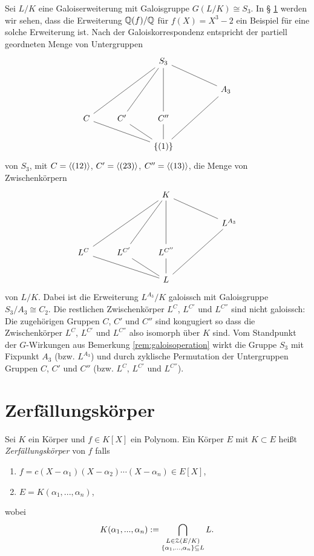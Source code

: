\documentclass{book}
\begin{document}
\begin{exa}
    \label{exa:label}
    Sei $L/K$ eine Galoiserweiterung mit Galoisgruppe $G(L/K) \cong S_3$. In \S
    \ref{sub:zerfallungskorper} werden wir sehen, dass die Erweiterung
    $\mathbb{Q}(f)/\mathbb{Q}$ für $f(X) = X^3 - 2$ ein Beispiel für eine solche
    Erweiterung ist. Nach der Galoiskorrespondenz entspricht der partiell
    geordneten Menge von Untergruppen
    \[
    \begin{tikzcd}
        & &S_3  & & \\
        & & & & A_3 \ar[ull,dash]\\
        C \ar[uurr,dash] & C'\ar[uur,dash] & C''\ar[uu,dash] &   \\
        & & \{ (1) \}\ar[ull,dash]\ar[ul,dash]\ar[u,dash]\ar[uurr,dash]&  & 
    \end{tikzcd}
    \]
    von $S_3$, mit $C = \langle (12) \rangle$, $C' = \langle (23) \rangle$, $C'' = \langle (13) \rangle$, die Menge von Zwischenkörpern
    \[
    \begin{tikzcd}
        & &K  & & \\
        & & & & L^{A_3} \ar[ull,dash]\\
        L^{C}\ar[uurr,dash] & L^{C'}\ar[uur,dash] & L^{C''} \ar[uu,dash] &   \\
        & & L\ar[ull,dash]\ar[ul,dash]\ar[u,dash]\ar[uurr,dash]&  & 
    \end{tikzcd}
    \]
    von $L/K$. Dabei ist die Erweiterung $L^{A_3}/K$ galoissch mit Galoisgruppe
    $S_3/A_3 \cong C_2$. Die restlichen Zwischenkörper $L^C$, $L^{C'}$ und
    $L^{C''}$ sind nicht galoissch: Die zugehörigen Gruppen $C$, $C'$ und
    $C''$ sind kongugiert so dass die Zwischenkörper $L^C$, $L^{C'}$ und
    $L^{C''}$ also isomorph über $K$ sind. Vom Standpunkt der $G$-Wirkungen aus
    Bemerkung \ref{rem:galoisoperation} wirkt die Gruppe $S_3$ mit Fixpunkt
    $A_3$ (bzw. $L^{A_3}$) und durch zyklische Permutation der Untergruppen
    Gruppen $C$, $C'$ und $C''$ (bzw. $L^C$, $L^{C'}$ und $L^{C''}$).
\end{exa}

\section{Zerfällungskörper}%
\label{sub:zerfallungskorper}

\begin{defi}
    \label{defi:zerfällung}
    Sei $K$ ein Körper und $f \in K[X]$ ein Polynom. Ein Körper $E$ mit $K \subset E$ heißt {\em Zerfällungskörper} von $f$ falls
    \begin{enumerate}
        \item $f = c (X - \alpha_1)(X- \alpha_2) \cdots (X - \alpha_n) \in E[X]$,
        \item $E = K(\alpha_1, ..., \alpha_n)$,
    \end{enumerate}
    wobei 
    \[
        K(\alpha_1, ..., \alpha_n) := \bigcap_{ \substack{ L \in \EuScript{Z}(E/K)\\ \{\alpha_1, ..., \alpha_n \} \subseteq L } } L.
    \]
\end{defi}
\end{document}
